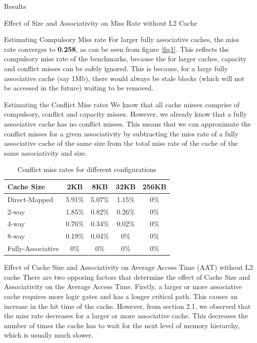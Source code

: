\begin{section}{Results}
\begin{subsection}{Effect of Size and Associativity on Miss Rate without L2 Cache}
    \begin{subsubsection}{Estimating Compulsory Miss rate}
    For larger fully associative caches, the miss rate converges to \textbf{0.258}, as can be seen from figure \ref{fig1}. This reflects the compulsory miss rate  of the benchmarks, because the for larger caches, capacity and conflict misses can be safely ignored. This is because, for a large fully associative cache (say 1Mb), there would always be stale blocks (which will not be accessed in the future) waiting to be removed. 
    \end{subsubsection}

    \begin{subsubsection}{Estimating the Conflict Miss rates}
    We know that all cache misses comprise of compulsory, conflict and capacity misses. However, we already know that a fully associative cache has no conflict misses. This means that we can approximate the conflict misses for a given associativity by subtracting the miss rate of a fully associative cache of the same size from the total miss rate of the cache of the same associativity and size. 
    \end{subsubsection}

    \begin{table}[h!]
        \centering
        \begin{tabular}{lcccc}
            \toprule
            \textbf{Cache Size} & \textbf{2KB} & \textbf{8KB} & \textbf{32KB} & \textbf{256KB} \\
            \midrule
            Direct-Mapped  & 5.91\% & 5.07\% & 1.15\% & 0\%\\
            2-way  & 1.85\%  & 0.82\% & 0.26\% & 0\%\\
            4-way  & 0.76\%  & 0.34\% & 0.02\% & 0\%\\
            8-way  & 0.19\% & 0.04\%  & 0\% & 0\%\\
            Fully-Associative & 0\%  & 0\% & 0\% & 0\%\\
            \bottomrule
        \end{tabular}
        \caption{Conflict miss rates for different configurations}
        \label{tab:miss_rates}
    \end{table}

    \end{subsection}

   

    \begin{subsection}{Effect of Cache Size and Associativity on Average Access Time (AAT) without L2 cache }
        There are two opposing factors that determine the effect of Cache Size and Associativity on the Average Access Time. Firstly, a larger or more associative cache requires more logic gates and has a longer critical path. This causes an increase in the hit time of the cache. However, from section 2.1, we observed that the miss rate decreases for a larger or more associative cache. This decreases the number of times the cache has to wait for the next level of memory hierarchy, which is usually much slower.


\end{subsection}
\end{section}
